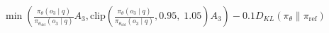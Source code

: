 \documentclass[preview]{standalone}
\begin{document}
\begin{align*}
\min \left(\frac{\pi_\theta(o_3 \mid q)}{\pi_{\theta_{\text{old}}}(o_3 \mid q)} A_3, \text{clip} \left( \frac{\pi_\theta(o_3 \mid q)}{\pi_{\theta_{\text{old}}}(o_3 \mid q)}, 0.95,\; 1.05 \right) A_3 \right) - 0.1 D_{KL}(\pi_\theta \parallel \pi_{\text{ref}})
\end{align*}
\end{document}
